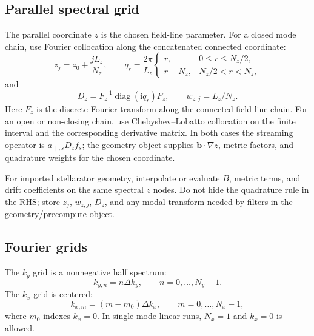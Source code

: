 \documentclass[11pt,a4paper]{article}
\newcommand{\ii}{\mathrm{i}}
\newcommand{\bvec}{\bm b}
\newcommand{\grad}{\nabla}
\DeclareMathOperator{\diag}{diag}
\begin{document}
\subsection{Parallel spectral grid}

The parallel coordinate \(z\) is the chosen field-line parameter.  For a closed mode chain, use Fourier collocation along the concatenated connected coordinate:
\begin{equation}
  z_j=z_0+\frac{jL_z}{N_z},
  \qquad
  q_r=\frac{2\pi}{L_z}
  \begin{cases}
    r, & 0\le r\le N_z/2,\\
    r-N_z, & N_z/2<r<N_z,
  \end{cases}
  \label{eq:z-fourier-grid}
\end{equation}
and
\begin{equation}
  D_z = F_z^{-1}\diag(\ii q_r)F_z,
  \qquad
  w_{z,j}=L_z/N_z.
  \label{eq:z-fourier-derivative}
\end{equation}
Here \(F_z\) is the discrete Fourier transform along the connected field-line chain.  For an open or non-closing chain, use Chebyshev--Lobatto collocation on the finite interval and the corresponding derivative matrix.  In both cases the streaming operator is \(a_{\parallel,s}D_z f_s\); the geometry object supplies \(\bvec\cdot\grad z\), metric factors, and quadrature weights for the chosen coordinate.

For imported stellarator geometry, interpolate or evaluate \(B\), metric terms, and drift coefficients on the same spectral \(z\) nodes.  Do not hide the quadrature rule in the RHS; store \(z_j\), \(w_{z,j}\), \(D_z\), and any modal transform needed by filters in the geometry/precompute object.

\subsection{Fourier grids}

The \(k_y\) grid is a nonnegative half spectrum:
\begin{equation}
  k_{y,n} = n\Delta k_y,\qquad n=0,\ldots,N_y-1.
  \label{eq:ky-grid}
\end{equation}
The \(k_x\) grid is centered:
\begin{equation}
  k_{x,m} = (m-m_0)\Delta k_x,\qquad m=0,\ldots,N_x-1,
  \label{eq:kx-grid}
\end{equation}
where \(m_0\) indexes \(k_x=0\).  In single-mode linear runs, \(N_x=1\) and \(k_x=0\) is allowed.
\end{document}
